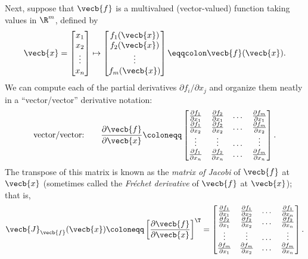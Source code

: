 Next, suppose that $\vecb{f}$ is a multivalued (vector-valued) function taking values in $\R^m$, defined by
\begin{equation*}
	\vecb{x} =
	\begin{bmatrix}
		x_1    \\
		x_2    \\
		\vdots \\
		x_n
	\end{bmatrix}
	\mapsto
	\begin{bmatrix}
		f_1(\vecb{x}) \\
		f_2(\vecb{x}) \\
		\vdots        \\
		f_m(\vecb{x})
	\end{bmatrix}
	\eqqcolon \vecb{f}(\vecb{x}).
\end{equation*}
We can compute each of the partial derivatives $\partial f_i / \partial x_j$ and organize them neatly in a ``vector/vector'' derivative notation:
\begin{equation}
	\text{vector/vector:} \qquad \frac{\partial \vecb{f}}{\partial \vecb{x}} \coloneqq
	\begin{bmatrix}
		\frac{\partial f_1}{\partial x_1} & \frac{\partial f_2}{\partial x_1} & \dots & \frac{\partial f_m}{\partial x_1} \\
		\frac{\partial f_1}{\partial x_2} & \frac{\partial f_2}{\partial x_2} & \dots & \frac{\partial f_m}{\partial x_2} \\
		\vdots                            & \vdots                            & \dots & \vdots                            \\
		\frac{\partial f_1}{\partial x_n} & \frac{\partial f_2}{\partial x_n} & \dots & \frac{\partial f_m}{\partial x_n}
	\end{bmatrix}. \label{eq:VectorVectorDerivative}
\end{equation}
The transpose of this matrix is known as the \textit{matrix of Jacobi} of $\vecb{f}$ at $\vecb{x}$ (sometimes called the \textit{Fr\'{e}chet derivative} of $\vecb{f}$ at $\vecb{x}$); that is,
\begin{equation}
	\vecb{J}_{\vecb{f}}(\vecb{x}) \coloneqq \left[ \frac{\partial \vecb{f}}{\partial \vecb{x}} \right]^\T =
	\begin{bmatrix}
		\frac{\partial f_1}{\partial x_1} & \frac{\partial f_1}{\partial x_2} & \dots & \frac{\partial f_1}{\partial x_n} \\
		\frac{\partial f_2}{\partial x_1} & \frac{\partial f_2}{\partial x_2} & \dots & \frac{\partial f_2}{\partial x_n} \\
		\vdots                            & \vdots                            & \dots & \vdots                            \\
		\frac{\partial f_m}{\partial x_1} & \frac{\partial f_m}{\partial x_2} & \dots & \frac{\partial f_m}{\partial x_n}
	\end{bmatrix}. \label{eq:JacobianMatrix}
\end{equation}
